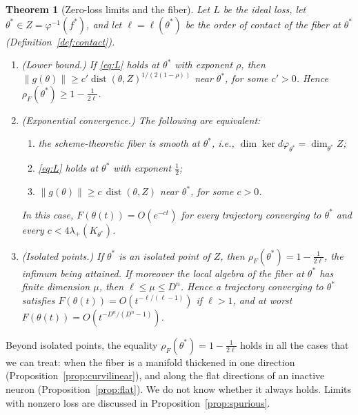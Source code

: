 \documentclass[11pt]{article}
\newtheorem{maintheorem}{Theorem}
\theoremstyle{definition}
\theoremstyle{remark}
\DeclareMathOperator{\dist}{dist}
\begin{document}
\begin{maintheorem}[Zero-loss limits and the fiber]\label{thm:fiber}
Let $L$ be the ideal loss, let $\theta^*\in Z=\varphi^{-1}(f^*)$, and let $\ell=\ell(\theta^*)$ be the order of contact of the fiber at $\theta^*$ (Definition~\ref{def:contact}).
\begin{enumerate}[label=\textup{(\roman*)},leftmargin=2.6em]
\item\label{B1} \emph{(Lower bound.)} If \eqref{eq:L} holds at $\theta^*$ with exponent $\rho$, then $\|g(\theta)\|\ge c'\dist(\theta,Z)^{1/(2(1-\rho))}$ near $\theta^*$, for some $c'>0$. Hence $\rho_F(\theta^*)\ge1-\frac1{2\ell}$.
\item\label{B2} \emph{(Exponential convergence.)} The following are equivalent:
  \begin{enumerate}[label=\textup{(\alph*)},nosep]
  \item\label{B2a} the scheme-theoretic fiber is smooth at $\theta^*$, i.e., $\dim\ker d\varphi_{\theta^*}=\dim_{\theta^*}Z$;
  \item\label{B2b} \eqref{eq:L} holds at $\theta^*$ with exponent $\frac12$;
  \item\label{B2c} $\|g(\theta)\|\ge c\,\dist(\theta,Z)$ near $\theta^*$, for some $c>0$.
  \end{enumerate}
  In this case, $F(\theta(t))=O(e^{-ct})$ for every trajectory converging to $\theta^*$ and every $c<4\lambda_+(K_{\theta^*})$.
\item\label{B3} \emph{(Isolated points.)} If $\theta^*$ is an isolated point of $Z$, then $\rho_F(\theta^*)=1-\frac1{2\ell}$, the infimum being attained. If moreover the local algebra of the fiber at $\theta^*$ has finite dimension $\mu$, then $\ell\le\mu\le D^n$. Hence a trajectory converging to $\theta^*$ satisfies $F(\theta(t))=O(t^{-\ell/(\ell-1)})$ if $\ell>1$, and at worst $F(\theta(t))=O(t^{-D^n/(D^n-1)})$.
\end{enumerate}
\end{maintheorem}

Beyond isolated points, the equality $\rho_F(\theta^*)=1-\frac1{2\ell}$ holds in all the cases that we can treat: when the fiber is a manifold thickened in one direction (Proposition~\ref{prop:curvilinear}), and along the flat directions of an inactive neuron (Proposition~\ref{prop:flat}). We do not know whether it always holds. Limits with nonzero loss are discussed in Proposition~\ref{prop:spurious}.
\end{document}
